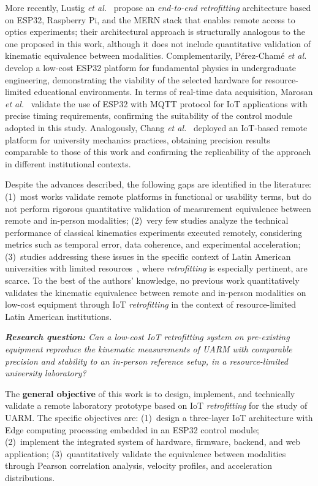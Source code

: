 \documentclass[sensors,article,submit,pdftex]{Definitions/mdpi}
\begin{document}
More recently, Lustig \textit{et al.}~\cite{r10} propose an \textit{end-to-end} \textit{retrofitting} architecture based on ESP32, Raspberry Pi, and the MERN stack that enables remote access to optics experiments; their architectural approach is structurally analogous to the one proposed in this work, although it does not include quantitative validation of kinematic equivalence between modalities. Complementarily, P\'erez-Cham\'e \textit{et al.}~\cite{r11} develop a low-cost ESP32 platform for fundamental physics in undergraduate engineering, demonstrating the viability of the selected hardware for resource-limited educational environments. In terms of real-time data acquisition, Marosan \textit{et al.}~\cite{r12} validate the use of ESP32 with MQTT protocol for IoT applications with precise timing requirements, confirming the suitability of the control module adopted in this study. Analogously, Chang \textit{et al.}~\cite{r52} deployed an IoT-based remote platform for university mechanics practices, obtaining precision results comparable to those of this work and confirming the replicability of the approach in different institutional contexts.

Despite the advances described, the following gaps are identified in the literature: (1)~most works validate remote platforms in functional or usability terms, but do not perform rigorous quantitative validation of measurement equivalence between remote and in-person modalities; (2)~very few studies analyze the technical performance of classical kinematics experiments executed remotely, considering metrics such as temporal error, data coherence, and experimental acceleration; (3)~studies addressing these issues in the specific context of Latin American universities with limited resources~\cite{r13,r14}, where \textit{retrofitting} is especially pertinent, are scarce. To the best of the authors' knowledge, no previous work quantitatively validates the kinematic equivalence between remote and in-person modalities on low-cost equipment through IoT \textit{retrofitting} in the context of resource-limited Latin American institutions.

\textit{\textbf{Research question:} Can a low-cost IoT \textit{retrofitting} system on pre-existing equipment reproduce the kinematic measurements of UARM with comparable precision and stability to an in-person reference setup, in a resource-limited university laboratory?}

The \textbf{general objective} of this work is to design, implement, and technically validate a remote laboratory prototype based on IoT \textit{retrofitting} for the study of UARM. The specific objectives are: (1)~design a three-layer IoT architecture with Edge computing processing embedded in an ESP32 control module; (2)~implement the integrated system of hardware, firmware, backend, and web application; (3)~quantitatively validate the equivalence between modalities through Pearson correlation analysis, velocity profiles, and acceleration distributions.
\end{document}
